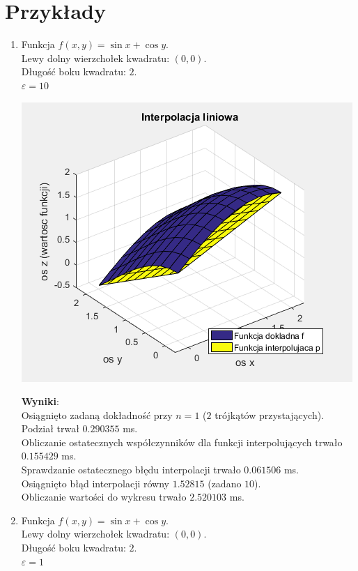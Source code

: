 \documentclass[12pt]{article}
\begin{document}
	\section{Przykłady}
	\begin{enumerate}[label=\textbf{Przykład \arabic*}]
		\item
		Funkcja $f(x, y) = \sin{x} + \cos{y}$.\\
		Lewy dolny wierzchołek kwadratu: $(0, 0)$.\\
		Długość boku kwadratu: $2$.\\
		$\varepsilon = 10$
		
		\includegraphics[]{images/example-1.png}
		
		\textbf{Wyniki}:\\
		Osiągnięto zadaną dokładność przy $n = 1$ ($2$ trójkątów przystających).\\
		Podział trwał $0.290355$ ms.\\
		Obliczanie ostatecznych współczynników dla funkcji interpolujących trwało $0.155429$ ms.\\
		Sprawdzanie ostatecznego błędu interpolacji trwało $0.061506$ ms.\\
		Osiągnięto błąd interpolacji równy $1.52815$ (zadano $10$).\\
		Obliczanie wartości do wykresu trwało $2.520103$ ms.
		\pagebreak
		
		
		\item
		Funkcja $f(x, y) = \sin{x} + \cos{y}$.\\
		Lewy dolny wierzchołek kwadratu: $(0, 0)$.\\
		Długość boku kwadratu: $2$.\\
		$\varepsilon = 1$
		

\end{enumerate}
\end{document}
